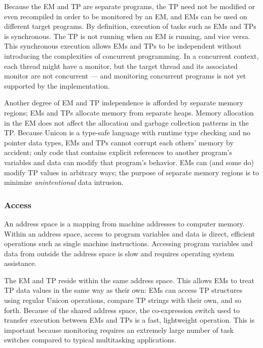 Because the EM and TP are separate programs, the TP need not be
modified or even recompiled in order to be monitored by an EM, and
EMs can be used on different target programs. By definition, execution
of tasks such as EMs and TPs is synchronous.  The TP is not
running when an EM is running, and vice versa.  This synchronous
execution allows EMs and TPs to be independent without introducing the
complexities of concurrent programming. In a concurrent context, each
thread might have a monitor, but the target thread and its associated
monitor are not concurrent --- and monitoring concurrent programs is not
yet supported by the implementation.

Another degree of EM and TP independence is afforded by separate
memory regions; EMs and TPs allocate memory from separate heaps.
Memory allocation in the EM does not affect the allocation
and garbage collection patterns in the TP. Because Unicon is a type-safe
language with runtime type checking and no pointer data types, EMs
and TPs cannot corrupt each others' memory by accident; only code that
contains explicit references to another program's variables and data
can modify that program's behavior.
EMs can (and some do) modify TP values in arbitrary ways; the purpose
of separate memory regions is to minimize {\em unintentional\/} data
intrusion.


\subsubsection{Access}

An address space is a mapping from machine addresses to computer memory.
Within an address space, access to program variables and data is direct,
efficient operations such as single machine instructions.  Accessing
program variables and data from outside the address space is slow and
requires operating system assistance.

The EM and TP reside within the same address space.  This allows EMs to
treat TP data values in the same way as their own: EMs can access TP
structures using regular Unicon operations, compare TP strings with their own,
and so forth.
Because of the shared address space, the co-expression switch used
to transfer execution between EMs and TPs is a fast,
lightweight operation.  This is important because monitoring
requires an extremely large number of task switches compared to
typical multitasking applications.


